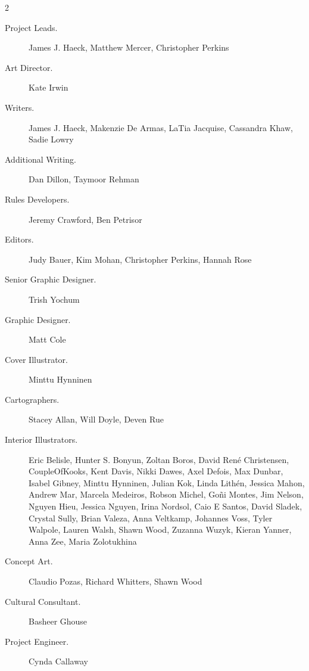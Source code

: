 \documentclass[10pt,a4paper,twoside,bg=print,twocolumn,openany,nodeprecatedcode]{dndbook}
\begin{document}
\begin{description}
\begin{multicols}{2}

\begin{description}
\item[Project Leads.]
James J. Haeck, Matthew Mercer, Christopher Perkins

\item[Art Director.]
Kate Irwin

\item[Writers.]
James J. Haeck, Makenzie De Armas, LaTia Jacquise, Cassandra Khaw, Sadie Lowry

\item[Additional Writing.]
Dan Dillon, Taymoor Rehman

\item[Rules Developers.]
Jeremy Crawford, Ben Petrisor

\item[Editors.]
Judy Bauer, Kim Mohan, Christopher Perkins, Hannah Rose

\item[Senior Graphic Designer.]
Trish Yochum

\item[Graphic Designer.]
Matt Cole

\item[Cover Illustrator.]
Minttu Hynninen

\item[Cartographers.]
Stacey Allan, Will Doyle, Deven Rue

\item[Interior Illustrators.]
Eric Belisle, Hunter S. Bonyun, Zoltan Boros, David René Christensen, CoupleOfKooks, Kent Davis, Nikki Dawes, Axel Defois, Max Dunbar, Isabel Gibney, Minttu Hynninen, Julian Kok, Linda Lithén, Jessica Mahon, Andrew Mar, Marcela Medeiros, Robson Michel, Goñi Montes, Jim Nelson, Nguyen Hieu, Jessica Nguyen, Irina Nordsol, Caio E Santos, David Sladek, Crystal Sully, Brian Valeza, Anna Veltkamp, Johannes Voss, Tyler Walpole, Lauren Walsh, Shawn Wood, Zuzanna Wuzyk, Kieran Yanner, Anna Zee, Maria Zolotukhina

\item[Concept Art.]
Claudio Pozas, Richard Whitters, Shawn Wood

\item[Cultural Consultant.]
Basheer Ghouse

\item[Project Engineer.]
Cynda Callaway


\end{description}
\end{multicols}
\end{description}
\end{document}
